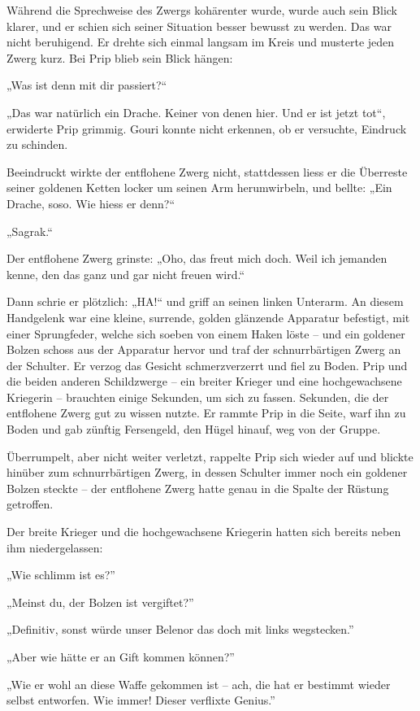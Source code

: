 \documentclass[10pt, a4paper, oneside]{book}
\begin{document}
Während die Sprechweise des Zwergs kohärenter wurde, wurde auch sein Blick klarer, und er schien sich seiner Situation besser bewusst zu werden. Das war nicht beruhigend. Er drehte sich einmal langsam im Kreis und musterte jeden Zwerg kurz. Bei Prip blieb sein Blick hängen:

„Was ist denn mit dir passiert?“

„Das war natürlich ein Drache. Keiner von denen hier. Und er ist jetzt tot“, erwiderte Prip grimmig. Gouri konnte nicht erkennen, ob er versuchte, Eindruck zu schinden.

Beeindruckt wirkte der entflohene Zwerg nicht, stattdessen liess er die Überreste seiner goldenen Ketten locker um seinen Arm herumwirbeln, und bellte: „Ein Drache, soso. Wie hiess er denn?“

„Sagrak.“

Der entflohene Zwerg grinste: „Oho, das freut mich doch. Weil ich jemanden kenne, den das ganz und gar nicht freuen wird.“

Dann schrie er plötzlich: „HA!“ und griff an seinen linken Unterarm. An diesem Handgelenk war eine kleine, surrende, golden glänzende Apparatur befestigt, mit einer Sprungfeder, welche sich soeben von einem Haken löste – und ein goldener Bolzen schoss aus der Apparatur hervor und traf der schnurrbärtigen Zwerg an der Schulter. Er verzog das Gesicht schmerzverzerrt und fiel zu Boden. Prip und die beiden anderen Schildzwerge – ein breiter Krieger und eine hochgewachsene Kriegerin – brauchten einige Sekunden, um sich zu fassen. Sekunden, die der entflohene Zwerg gut zu wissen nutzte. Er rammte Prip in die Seite, warf ihn zu Boden und gab zünftig Fersengeld, den Hügel hinauf, weg von der Gruppe.

Überrumpelt, aber nicht weiter verletzt, rappelte Prip sich wieder auf und blickte hinüber zum schnurrbärtigen Zwerg, in dessen Schulter immer noch ein goldener Bolzen steckte – der entflohene Zwerg hatte genau in die Spalte der Rüstung getroffen.

Der breite Krieger und die hochgewachsene Kriegerin hatten sich bereits neben ihm niedergelassen:

„Wie schlimm ist es?”

„Meinst du, der Bolzen ist vergiftet?”

„Definitiv, sonst würde unser Belenor das doch mit links wegstecken.”

„Aber wie hätte er an Gift kommen können?”

„Wie er wohl an diese Waffe gekommen ist – ach, die hat er bestimmt wieder selbst entworfen. Wie immer! Dieser verflixte Genius.”
\end{document}
